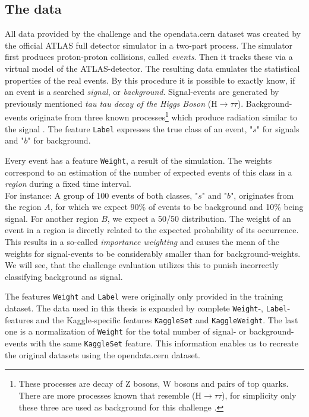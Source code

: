\subsection{The data}\label{sec:data}
All data provided by the challenge and the opendata.cern dataset \cite{higgsData} was created by the official ATLAS full detector simulator in a two-part process. The simulator first produces proton-proton collisions, called \emph{events}. Then it tracks these via a virtual model of the ATLAS-detector. The resulting data emulates the statistical properties of the real events. By this procedure it is possible to exactly know, if an event is a searched \emph{signal}, or \emph{background}. Signal-events are generated by previously mentioned \emph{tau tau decay of the Higgs Boson} ($\mathrm{H}\rightarrow\tau\tau $). Background-events originate from three known processes\footnote{These processes are decay of Z bosons, W bosons and pairs of top quarks. There are more processes known that resemble ($\mathrm{H}\rightarrow\tau\tau $), for simplicity only these three are used as background for this challenge \cite{higgsPaper}.} which produce radiation similar to the signal \cite{higgsPaper}. The feature \texttt{Label} expresses the true class of an event, "$s$" for signals and "$b$" for background.

Every event has a feature \texttt{Weight}, a result of the simulation. The weights correspond to an estimation of the number of expected events of this class in a \emph{region} during a fixed time interval\cite{higgsPaper}.\\
For instance:
A group of 100 events of both classes, "$s$" and "$b$", originates from the region $A$, for which we expect 90\% of events to be background and 10\% being signal.
For another region $B$, we expect a 50/50 distribution. The weight of an event in a region is directly related to the expected probability of its occurrence. This results in a so-called \emph{importance weighting} and causes the mean of the weights for signal-events to be considerably smaller than for background-weights. We will see, that the challenge evaluation utilizes this to punish incorrectly classifying background as signal.

The features \texttt{Weight} and \texttt{Label} were originally only provided in the training dataset. The data used in this thesis is expanded by complete \texttt{Weight}-, \texttt{Label}-features and the Kaggle-specific features \texttt{KaggleSet} and \texttt{KaggleWeight}. The last one is a normalization of \texttt{Weight} for the total number of signal- or background-events with the same \texttt{KaggleSet} feature.
This information enables us to recreate the original datasets using the opendata.cern dataset.

